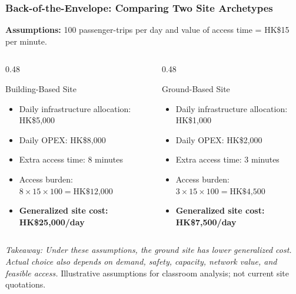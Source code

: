 \documentclass{beamer}
\begin{document}
\begin{frame}[t,shrink=12]
\frametitle{Back-of-the-Envelope: Comparing Two Site Archetypes}
\textbf{Assumptions:} 100 passenger-trips per day and value of access time = HK\$15 per minute.
\begin{columns}[T]
\begin{column}{0.48\textwidth}\begin{block}{Building-Based Site}
\begin{itemize}
\item Daily infrastructure allocation: HK\$5,000
\item Daily OPEX: HK\$8,000
\item Extra access time: 8 minutes
\item Access burden: $8\times15\times100=\text{HK\$12,000}$
\item \textbf{Generalized site cost: HK\$25,000/day}
\end{itemize}\end{block}\end{column}
\begin{column}{0.48\textwidth}\begin{block}{Ground-Based Site}
\begin{itemize}
\item Daily infrastructure allocation: HK\$1,000
\item Daily OPEX: HK\$2,000
\item Extra access time: 3 minutes
\item Access burden: $3\times15\times100=\text{HK\$4,500}$
\item \textbf{Generalized site cost: HK\$7,500/day}
\end{itemize}\end{block}\end{column}
\end{columns}
\textit{Takeaway: Under these assumptions, the ground site has lower generalized cost. Actual choice also depends on demand, safety, capacity, network value, and feasible access.}
\vfill{\tiny Illustrative assumptions for classroom analysis; not current site quotations.}
\end{frame}
\end{document}
